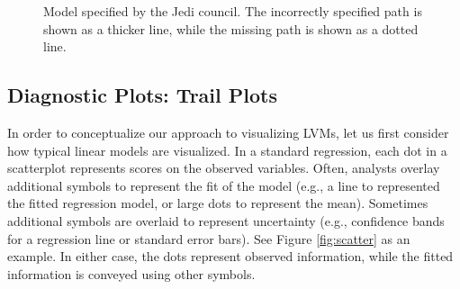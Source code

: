 \documentclass[
  english,
  doc]{apa6}
\begin{document}
\begin{center}
\begin{figure}
\usetikzlibrary{arrows}
\caption{Model specified by the Jedi council. The incorrectly specified path is shown as a thicker line, while the missing path is shown as a dotted line.}
\label{fig:council_model}
\end{figure}
\end{center}

\hypertarget{diagnostic-plots-trail-plots}{%
\subsection{Diagnostic Plots: Trail Plots}\label{diagnostic-plots-trail-plots}}

In order to conceptualize our approach to visualizing LVMs, let us first consider how typical linear models are visualized. In a standard regression, each dot in a scatterplot represents scores on the observed variables. Often, analysts overlay additional symbols to represent the fit of the model (e.g., a line to represented the fitted regression model, or large dots to represent the mean). Sometimes additional symbols are overlaid to represent uncertainty (e.g., confidence bands for a regression line or standard error bars). See Figure \ref{fig:scatter} as an example. In either case, the dots represent observed information, while the fitted information is conveyed using other symbols.
\end{document}
